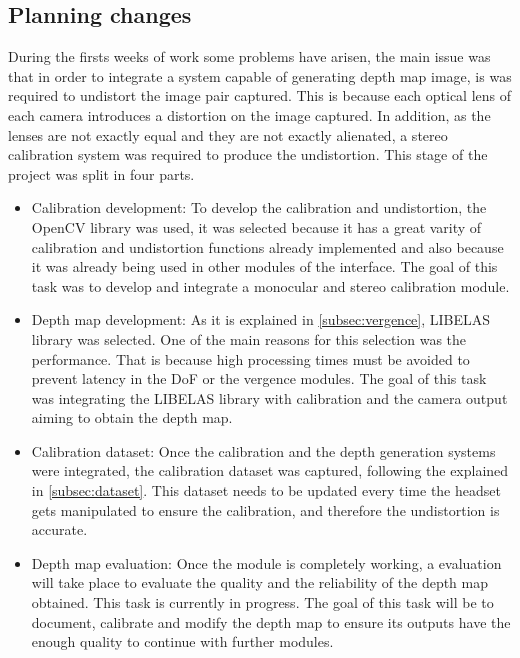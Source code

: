\documentclass[10pt,a4paper,twocolumn,twoside]{article}
\begin{document}
	\subsection{Planning changes}
		
	During the firsts weeks of work some problems have arisen, the main issue was that in order to integrate a system capable of generating depth map image, is was required to undistort the image pair captured. This is because each optical lens of each camera introduces a distortion on the image captured. In addition, as the lenses are not exactly equal and they are not exactly alienated, a stereo calibration system was required to produce the undistortion. This stage of the project was split in four parts.
	
	\begin{itemize}
		\item Calibration development: To develop the calibration and undistortion, the OpenCV library \cite{web:opencv} was used, it was selected because it has a great varity of calibration and undistortion functions already implemented and also because it was already being used in other modules of the interface. The goal of this task was to develop and integrate a monocular and stereo calibration module.
		
		\item Depth map development: As it is explained in \ref{subsec:vergence}, LIBELAS library was selected. One of the main reasons for this selection was the performance. That is because high processing times must be avoided to prevent latency in the DoF or the vergence modules. The goal of this task was integrating the LIBELAS library with calibration and the camera output aiming to obtain the depth map. 
		
		\item Calibration dataset: Once the calibration and the depth generation systems were integrated, the calibration dataset was captured, following the explained in \ref{subsec:dataset}. This dataset needs to be updated every time the headset gets manipulated to ensure the calibration, and therefore the undistortion is accurate.
		
		\item Depth map evaluation: Once the module is completely working, a evaluation will take place to evaluate the quality and the reliability of the depth map obtained. This task is currently in progress. The goal of this task will be to document, calibrate and modify the depth map to ensure its outputs have the enough quality to continue with further modules.
	\end{itemize}
\end{document}
